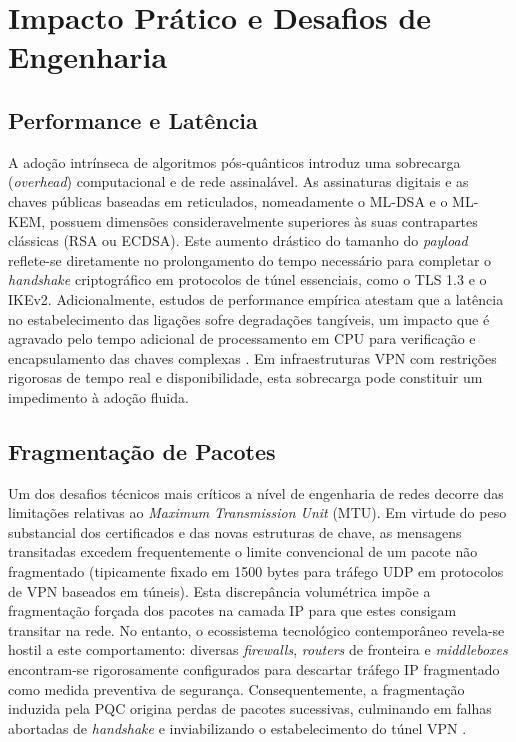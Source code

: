\documentclass[runningheads]{llncs}
\begin{document}
\section{Impacto Prático e Desafios de Engenharia}

\subsection{Performance e Latência}
A adoção intrínseca de algoritmos pós-quânticos introduz uma sobrecarga (\textit{overhead}) computacional e de rede assinalável. As assinaturas digitais e as chaves públicas baseadas em reticulados, nomeadamente o ML-DSA e o ML-KEM, possuem dimensões consideravelmente superiores às suas contrapartes clássicas (RSA ou ECDSA). Este aumento drástico do tamanho do \textit{payload} reflete-se diretamente no prolongamento do tempo necessário para completar o \textit{handshake} criptográfico em protocolos de túnel essenciais, como o TLS 1.3 e o IKEv2. Adicionalmente, estudos de performance empírica atestam que a latência no estabelecimento das ligações sofre degradações tangíveis, um impacto que é agravado pelo tempo adicional de processamento em CPU para verificação e encapsulamento das chaves complexas \cite{cryptoeprint:2020/071,oterogarcia2025introducingpostquantumalgorithmsopen}. Em infraestruturas VPN com restrições rigorosas de tempo real e disponibilidade, esta sobrecarga pode constituir um impedimento à adoção fluida.

\subsection{Fragmentação de Pacotes}
Um dos desafios técnicos mais críticos a nível de engenharia de redes decorre das limitações relativas ao \textit{Maximum Transmission Unit} (MTU). Em virtude do peso substancial dos certificados e das novas estruturas de chave, as mensagens transitadas excedem frequentemente o limite convencional de um pacote não fragmentado (tipicamente fixado em 1500 bytes para tráfego UDP em protocolos de VPN baseados em túneis). Esta discrepância volumétrica impõe a fragmentação forçada dos pacotes na camada IP para que estes consigam transitar na rede. No entanto, o ecossistema tecnológico contemporâneo revela-se hostil a este comportamento: diversas \textit{firewalls}, \textit{routers} de fronteira e \textit{middleboxes} encontram-se rigorosamente configurados para descartar tráfego IP fragmentado como medida preventiva de segurança. Consequentemente, a fragmentação induzida pela PQC origina perdas de pacotes sucessivas, culminando em falhas abortadas de \textit{handshake} e inviabilizando o estabelecimento do túnel VPN \cite{cryptoeprint:2020/071,mallick2026studypostquantumstatus}.
\end{document}
